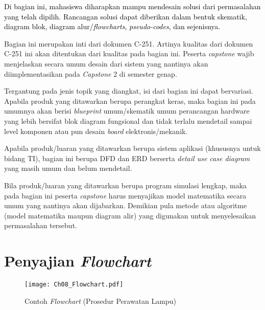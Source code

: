 \textcolor{black}{Di bagian ini, mahasiswa diharapkan mampu mendesain solusi dari permasalahan yang telah dipilih. Rancangan solusi dapat diberikan dalam bentuk skematik, diagram blok, diagram alur/\textit{flowcharts}, \textit{pseudo-codes}, dan sejenisnya.
}

Bagian ini merupakan inti dari dokumen C-251. Artinya kualitas dari dokumen C-251 ini akan ditentukan dari kualitas pada bagian ini. Peserta \textit{capstone} wajib menjelaskan secara umum desain dari sistem yang nantinya akan diimplementasikan pada \textit{Capstone} 2 di semester genap. 

Tergantung pada jenis topik yang diangkat, isi dari bagian ini dapat bervariasi. Apabila produk yang ditawarkan berupa perangkat keras, maka bagian ini pada umumnya akan berisi \textit{blueprint} umum/skematik umum perancangan hardware yang lebih bersifat blok diagram fungsional dan tidak terlalu mendetail sampai level komponen atau pun desain \textit{board} elektronis/mekanik. 

Apabila produk/luaran yang ditawarkan berupa sistem aplikasi (khususnya untuk bidang TI), bagian ini berupa DFD dan ERD berserta \textit{detail use case diagram} yang masih umum dan belum mendetail. 

Bila produk/luaran yang ditawarkan berupa program simulasi lengkap, maka pada bagian ini peserta \textit{capstone} harus menyajikan model matematika secara umum yang nantinya akan dijabarkan. Demikian pula metode atau algoritme (model matematika maupun diagram alir) yang digunakan untuk menyelesaikan permasalahan tersebut.

\section{Penyajian \textit{Flowchart}}
    
    \begin{figure}[!ht]
        \centering
        \texttt{[image: Ch08\_Flowchart.pdf]}
        \caption{Contoh \textit{Flowchart} (Prosedur Perawatan Lampu)}
        \label{fig:Ch08_Flowchart}
    \end{figure}
    
